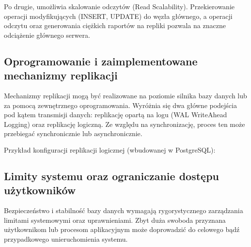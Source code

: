 \documentclass[letterpaper,10pt,polish]{sphinxmanual}
\begin{document}
\sphinxAtStartPar
Po drugie, umożliwia skalowanie odczytów (Read Scalability). Przekierowanie operacji modyfikujących (INSERT, UPDATE) do węzła głównego, a operacji odczytu oraz generowania ciężkich raportów na repliki pozwala na znaczne odciążenie głównego serwera.


\subsection{Oprogramowanie i zaimplementowane mechanizmy replikacji}
\label{\detokenize{rozdzia_u0142_2/rozdzia_u0142_25/index:oprogramowanie-i-zaimplementowane-mechanizmy-replikacji}}
\sphinxAtStartPar
Mechanizmy replikacji mogą być realizowane na poziomie silnika bazy danych lub za pomocą zewnętrznego oprogramowania. Wyróżnia się dwa główne podejścia pod kątem transmisji danych: replikację opartą na logu (WAL \sphinxhyphen{} Write\sphinxhyphen{}Ahead Logging) oraz replikację logiczną. Ze względu na synchronizację, proces ten może przebiegać synchronicznie lub asynchronicznie.

\sphinxAtStartPar
Przykład konfiguracji replikacji logicznej (wbudowanej w PostgreSQL):

\begin{sphinxVerbatim}[commandchars=\\\{\}]

\end{sphinxVerbatim}


\subsection{Limity systemu oraz ograniczanie dostępu użytkowników}
\label{\detokenize{rozdzia_u0142_2/rozdzia_u0142_25/index:limity-systemu-oraz-ograniczanie-dostepu-uzytkownikow}}
\sphinxAtStartPar
Bezpieczeństwo i stabilność bazy danych wymagają rygorystycznego zarządzania limitami systemowymi oraz uprawnieniami. Zbyt duża swoboda przyznana użytkownikom lub procesom aplikacyjnym może doprowadzić do celowego bądź przypadkowego unieruchomienia systemu.
\end{document}
